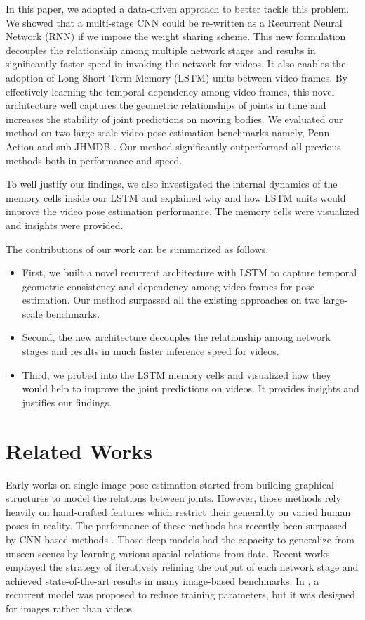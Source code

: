 \documentclass[10pt,twocolumn,letterpaper]{article}
\begin{document}
In this paper, we adopted a data-driven approach to better tackle this problem. We showed that a multi-stage CNN could be re-written as a Recurrent Neural Network (RNN) if we impose the weight sharing scheme. This new formulation decouples the relationship among multiple network stages and results in significantly faster speed in invoking the network for videos. It also enables the adoption of Long Short-Term Memory (LSTM) units between video frames. By effectively learning the temporal dependency among video frames, this novel architecture well captures the geometric relationships of joints in time and increases the stability of joint predictions on moving bodies. We evaluated our method on two large-scale video pose estimation benchmarks namely, Penn Action \cite{zhang13penn} and sub-JHMDB \cite{jhuang13jhmdb}. Our method significantly outperformed all previous methods both in performance and speed.

To well justify our findings, we also investigated the internal dynamics of the memory cells inside our LSTM and explained why and how LSTM units would improve the video pose estimation performance. The memory cells were visualized and insights were provided.

The contributions of our work can be summarized as follows.

\begin{itemize}
\item First, we built a novel recurrent architecture with LSTM to capture temporal geometric consistency and dependency among video frames for pose estimation. Our method surpassed all the existing approaches on two large-scale benchmarks.
\item Second, the new architecture decouples the relationship among network stages and results in much faster inference speed for videos.
\item Third, we probed into the LSTM memory cells and visualized how they would help to improve the joint predictions on videos. It provides insights and justifies our findings.
\end{itemize}

\section{Related Works}

Early works on single-image pose estimation started from building graphical structures \cite{and09part,felz05PS,pish13imagePS,tian12hiera,yang13mixPCK} to model the relations between joints. However, those methods rely heavily on hand-crafted features which restrict their generality on varied human poses in reality. The performance of these methods has recently been surpassed by CNN based methods \cite{cao2017realtime,chu2017multi,new16refine,tom14heat,toshev14deeppose,wei16refineCPM}. Those deep models had the capacity to generalize from unseen scenes by learning various spatial relations from data. Recent works \cite{new16refine,wei16refineCPM} employed the strategy of iteratively refining the output of each network stage and achieved state-of-the-art results in many image-based benchmarks. In \cite{bel17recur}, a recurrent model was proposed to reduce training parameters, but it was designed for images rather than videos.
\end{document}
